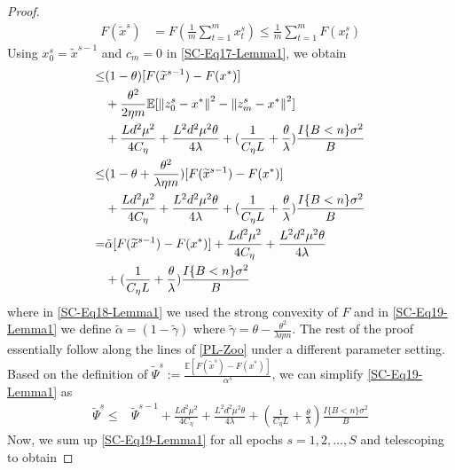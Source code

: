 \documentclass{article}
\newcommand*{\E}{\mathbb{E}}
\newcommand{\norm}[1]{\left\lVert#1\right\rVert}
\theoremstyle{definition}
\theoremstyle{remark}
\begin{document}
{\begin{proof}
\begin{equation}
\begin{split}
F(\widetilde{x}^s) &= F(\frac{1}{m}\sum_{t=1}^{m} x_{t}^s)\leq \frac{1}{m}\sum_{t=1}^{m}F(x_{t}^s)
\end{split}
\end{equation}
Using $x_0^s = \widetilde{x}^{s-1}$ and $c_m=0$ in \eqref{SC-Eq17-Lemma1}, we obtain
\begin{align}
[F(\widetilde{x}^{s})-F(x^*)] \leq &(1-\theta)[F(\widetilde{x}^{s-1})-F(x^*)]\notag \\
&+ {\frac{ \theta^2}{2\eta m}}\E[\norm{z_{0}^s-x^*}^2-\norm{z_{m}^s-x^*}^2]\notag\\
&+\frac{Ld^2\mu^2}{4C_{\eta}}+\frac{ L^2d^2\mu^2\theta}{4\lambda}+(\frac{1}{C_{\eta} L}+\frac{\theta}{\lambda})\frac{I\{B < n\} \sigma ^2}{B}\notag\\
\leq&(1-\theta+\frac{ \theta^2}{\lambda\eta m})[F(\widetilde{x}^{s-1})-F(x^*)] \notag\\
&+\frac{Ld^2\mu^2}{4C_{\eta}}+\frac{ L^2d^2\mu^2\theta}{4\lambda}+(\frac{1}{C_{\eta} L}+\frac{\theta}{\lambda})\frac{I\{B < n\} \sigma ^2}{B}\label{SC-Eq18-Lemma1}\\
=&\tilde{\alpha}[F(\widetilde{x}^{s-1})-F(x^*)] +\frac{Ld^2\mu^2}{4C_{\eta}}+\frac{ L^2d^2\mu^2\theta}{4\lambda}\notag\\
&+(\frac{1}{C_{\eta} L}+\frac{\theta}{\lambda})\frac{I\{B < n\} \sigma ^2}{B}\label{SC-Eq19-Lemma1}
\end{align}
where in \eqref{SC-Eq18-Lemma1} we used the strong convexity of $F$ and in \eqref{SC-Eq19-Lemma1} we define $\tilde{\alpha} = (1-\widetilde{\gamma})$ where $\widetilde{\gamma}  = \theta - \frac{ \theta^2}{\lambda\eta m}$. The rest of the proof essentially follow along the lines of \ref{PL-Zoo} under a different parameter setting. Based on the definition of $\widetilde{\Psi}^s := \frac{\E[F(\tilde{x}^s)-F(x^*)]}{{\alpha}^s}$, we can simplify \eqref{SC-Eq19-Lemma1} as
\begin{equation}\label{SC-Eq19-1-Lemma1}
\begin{split}
\widetilde{\Psi}^s \leq& \widetilde{\Psi}^{s-1} + \frac{Ld^2\mu^2}{4C_{\eta}}+\frac{ L^2d^2\mu^2\theta}{4\lambda}+(\frac{1}{C_{\eta} L}+\frac{\theta}{\lambda})\frac{I\{B < n\} \sigma ^2}{B}
\end{split}
\end{equation}
Now, we sum up \eqref{SC-Eq19-Lemma1} for all epochs $s=1, 2,\ldots, S$ and telescoping to obtain


\end{proof}}
\end{document}
